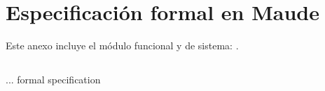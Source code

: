 \chapter{Especificaci\'on formal en Maude}
\label{a.appendix}

Este anexo incluye el m\'odulo funcional y de sistema: .

\section{}
\label{sccp.appendix}

\begin{maude}
... formal specification
\end{maude}
